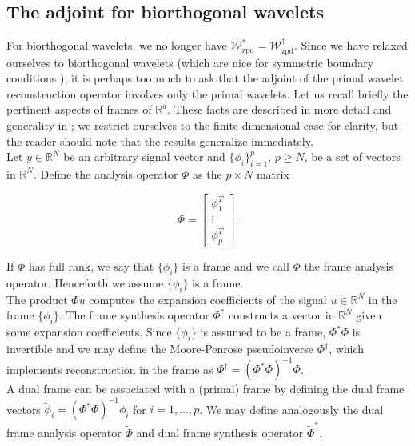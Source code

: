 \documentclass[journal]{IEEEtran}
\newcommand{\reals}{\mathbb{R}}
\begin{document}
\subsection{The adjoint for biorthogonal wavelets}
For biorthogonal wavelets, we no longer have $\mathcal{W}_\text{zpd}^\ast=\mathcal{W}_\text{zpd}^\dagger$.  Since we have relaxed ourselves to biorthogonal wavelets (which are nice for symmetric boundary conditions \cite{rout_2003}), it is perhaps too much to ask that the adjoint of the primal wavelet reconstruction operator involves only the primal wavelets.  Let us recall briefly the pertinent aspects of frames of $\reals^d$.  These facts are described in more detail and generality in \cite{mallat_2009}; we restrict ourselves to the finite dimensional case for clarity, but the reader should note that the results generalize immediately.\\

Let $y\in\reals^N$ be an arbitrary signal vector and $\{\phi_i\}_{i=1}^p$, $p\ge N$, be a set of vectors in $\reals^N$.  Define the analysis operator $\Phi$ as the $p\times N$ matrix

\[ \Phi = \begin{bmatrix}\phi_1^T\\\vdots\\\phi_p^T\end{bmatrix}. \] 

   \noindent If $\Phi$ has full rank, we say that $\{\phi_i\}$ is a frame and we call $\Phi$ the frame analysis operator.  Henceforth we assume $\{\phi_i\}$ is a frame.\\
   
   The product $\Phi u$ computes the expansion coefficients of the signal ${u\in\reals^N}$ in the frame $\{\phi_i\}$.  The frame synthesis operator $\Phi^\ast$ constructs a vector in $\reals^N$ given some expansion coefficients.  Since $\{\phi_i\}$ is assumed to be a frame, $\Phi^\ast\Phi$ is invertible and we may define the Moore-Penrose pseudoinverse $\Phi^\dagger$, which implements reconstruction in the frame as $\Phi^\dagger=\left(\Phi^\ast\Phi\right)^{-1}\Phi$.\\

   A dual frame can be associated with a (primal) frame by defining the dual frame vectors $\tilde{\phi}_i = \left(\Phi^\ast\Phi\right)^{-1}\phi_i$ for $i=1,...,p$.  We may define analogously the dual frame analysis operator $\tilde{\Phi}$ and dual frame synthesis operator $\tilde{\Phi}^\ast$.\\
\end{document}
